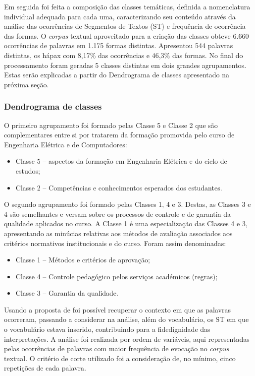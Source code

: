 \documentclass{textolivre-html}
\begin{document}
Em seguida foi feita a composição das classes temáticas, definida a nomenclatura individual adequada para cada uma, caracterizando seu conteúdo através da análise das ocorrências de Segmentos de Textos (ST) e frequência de ocorrência das formas.
O \textit{corpus} textual aproveitado para a criação das classes obteve 6.660 ocorrências de palavras em 1.175 formas distintas. Apresentou 544 palavras distintas, os hápax com 8,17\% das ocorrências e 46,3\% das formas. No final do processamento foram geradas 5 classes distintas em dois grandes agrupamentos. Estas serão explicadas a partir do Dendrograma de classes apresentado na próxima seção.

\subsubsection{Dendrograma de classes}\label{sec-dendrograma}
O primeiro agrupamento foi formado pelas Classe 5 e Classe 2 que são complementares entre si por tratarem da formação promovida pelo curso de Engenharia Elétrica e de Computadores:

\begin{itemize}
\item Classe 5 – aspectos da formação em Engenharia Elétrica e do ciclo de estudos;
\item Classe 2 – Competências e conhecimentos esperados dos estudantes.
\end{itemize}

O segundo agrupamento foi formado pelas Classes 1, 4 e 3. Destas, as Classes 3 e 4 são semelhantes e versam sobre os processos de controle e de garantia da qualidade aplicados no curso. A Classe 1 é uma especialização das Classes 4 e 3, apresentando as minúcias relativas aos métodos de avaliação associados aos critérios normativos institucionais e do curso. Foram assim denominadas:

\begin{itemize}
\item Classe 1 – Métodos e critérios de aprovação;
\item Classe 4 – Controle pedagógico pelos serviços académicos (regras);
\item Classe 3 – Garantia da qualidade.
\end{itemize}

Usando a proposta de \textcite{reinert1990} foi possível recuperar o contexto em que as palavras ocorreram, passando a considerar na análise, além do vocabulário, os ST em que o vocabulário estava inserido, contribuindo para a fidedignidade das interpretações. A análise foi realizada por ordem de variáveis, aqui representadas pelas ocorrências de palavras com maior frequência de evocação no \textit{corpus} textual. O critério de corte utilizado foi a consideração de, no mínimo, cinco repetições de cada palavra.
\end{document}
